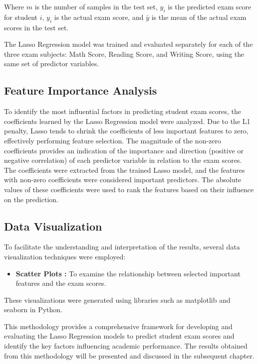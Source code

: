 \documentclass[a4paper,12pt]{article}
\begin{document}
	Where \( m \) is the number of samples in the test set, \( \hat{y}_i \) is the predicted exam score for student \( i \), \( y_i \) is the actual exam score, and \( \bar{y} \) is the mean of the actual exam scores in the test set.
	
	The Lasso Regression model was trained and evaluated separately for each of the three exam subjects: Math Score, Reading Score, and Writing Score, using the same set of predictor variables.

	\subsection{Feature Importance Analysis}	
	To identify the most influential factors in predicting student exam scores, the coefficients learned by the Lasso Regression model were analyzed. Due to the L1 penalty, Lasso tends to shrink the coefficients of less important features to zero, effectively performing feature selection. The magnitude of the non-zero coefficients provides an indication of the importance and direction (positive or negative correlation) of each predictor variable in relation to the exam scores. The coefficients were extracted from the trained Lasso model, and the features with non-zero coefficients were considered important predictors. The absolute values of these coefficients were used to rank the features based on their influence on the prediction.


	\subsection{Data Visualization}	
	To facilitate the understanding and interpretation of the results, several data visualization techniques were employed:
	
		\begin{itemize}
		\item \textbf{ Scatter Plots : } To examine the relationship between selected important features and the exam scores.
		\end{itemize}
	
		These visualizations were generated using libraries such as matplotlib and seaborn in Python.
		
		This methodology provides a comprehensive framework for developing and evaluating the Lasso Regression models to predict student exam scores and identify the key factors influencing academic performance. The results obtained from this methodology will be presented and discussed in the subsequent chapter.
	
\end{document}
